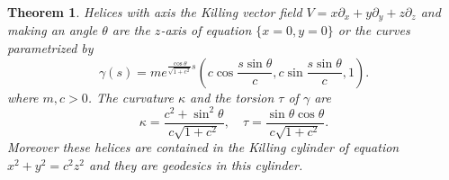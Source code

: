 \documentclass[a4paper,12pt]{amsart}
\newtheorem{theorem}{Theorem}[section]
\theoremstyle{definition}
\begin{document}
  
  \begin{theorem}\label{t31}
   Helices with axis the Killing vector field $V=x\partial_x+y\partial_y+z\partial_z$ and making an angle $\theta$ are the $z$-axis of equation $\{x=0,y=0\}$ or the curves parametrized by 
  \begin{equation}\label{h0}
 \gamma(s)=me^{\frac{\cos\theta}{\sqrt{1+c^2}}s}\left(c \cos\frac{s\sin\theta}{c},c \sin \frac{s\sin\theta}{c}, 1\right).
 \end{equation}
where $m,c>0$. The curvature $\kappa$ and the torsion $\tau$ of $\gamma$   are
\begin{equation}\label{h01}
\kappa=\frac{c^2+\sin^2\theta}{c\sqrt{1+c^2}},\quad \tau=\frac{\sin\theta\cos\theta}{c\sqrt{1+c^2}}.
\end{equation}
Moreover these helices are contained in the Killing cylinder of equation $x^2+y^2=c^2z^2$ and they are geodesics in this cylinder.
  \end{theorem}
\end{document}
